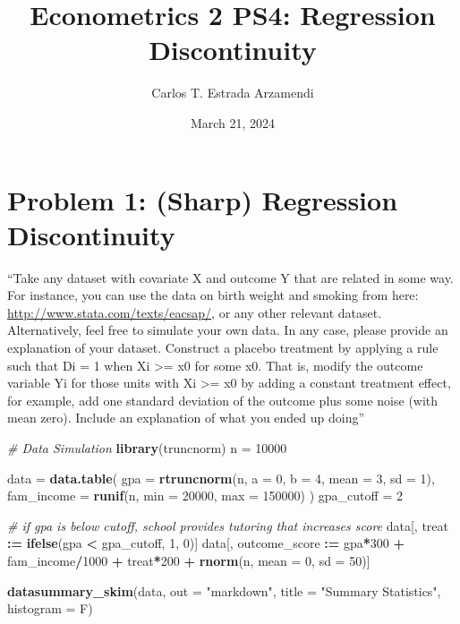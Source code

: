 \documentclass[
]{article}
\title{Econometrics 2 PS4: Regression Discontinuity}
\author{Carlos T. Estrada Arzamendi}
\date{March 21, 2024}
\newenvironment{Shaded}{\begin{snugshade}}{\end{snugshade}}
\newcommand{\AttributeTok}[1]{\textcolor[rgb]{0.13,0.29,0.53}{#1}}
\newcommand{\CommentTok}[1]{\textcolor[rgb]{0.56,0.35,0.01}{\textit{#1}}}
\newcommand{\DecValTok}[1]{\textcolor[rgb]{0.00,0.00,0.81}{#1}}
\newcommand{\FunctionTok}[1]{\textcolor[rgb]{0.13,0.29,0.53}{\textbf{#1}}}
\newcommand{\NormalTok}[1]{#1}
\newcommand{\OtherTok}[1]{\textcolor[rgb]{0.56,0.35,0.01}{#1}}
\newcommand{\SpecialCharTok}[1]{\textcolor[rgb]{0.81,0.36,0.00}{\textbf{#1}}}
\newcommand{\StringTok}[1]{\textcolor[rgb]{0.31,0.60,0.02}{#1}}
\begin{document}
\maketitle

\hypertarget{problem-1-sharp-regression-discontinuity}{%
\section{Problem 1: (Sharp) Regression
Discontinuity}\label{problem-1-sharp-regression-discontinuity}}



``Take any dataset with covariate X and outcome Y that are related in
some way. For instance, you can use the data on birth weight and smoking
from here: \url{http://www.stata.com/texts/eacsap/}, or any other
relevant dataset. Alternatively, feel free to simulate your own data. In
any case, please provide an explanation of your dataset. Construct a
placebo treatment by applying a rule such that Di = 1 when Xi
\textgreater= x0 for some x0. That is, modify the outcome variable Yi
for those units with Xi \textgreater= x0 by adding a constant treatment
effect, for example, add one standard deviation of the outcome plus some
noise (with mean zero). Include an explanation of what you ended up
doing''

\begin{Shaded}
\begin{Highlighting}[]
\CommentTok{\# Data Simulation}
\FunctionTok{library}\NormalTok{(truncnorm)}
\NormalTok{n }\OtherTok{=} \DecValTok{10000}

\NormalTok{data }\OtherTok{=} \FunctionTok{data.table}\NormalTok{(}
  \AttributeTok{gpa =} \FunctionTok{rtruncnorm}\NormalTok{(n, }\AttributeTok{a =} \DecValTok{0}\NormalTok{, }\AttributeTok{b =} \DecValTok{4}\NormalTok{, }\AttributeTok{mean =} \DecValTok{3}\NormalTok{, }\AttributeTok{sd =} \DecValTok{1}\NormalTok{),}
  \AttributeTok{fam\_income =} \FunctionTok{runif}\NormalTok{(n, }\AttributeTok{min =} \DecValTok{20000}\NormalTok{, }\AttributeTok{max =} \DecValTok{150000}\NormalTok{)}
\NormalTok{)}
\NormalTok{gpa\_cutoff }\OtherTok{=} \DecValTok{2}

\CommentTok{\# if gpa is below cutoff, school provides tutoring that increases score}
\NormalTok{data[, treat }\SpecialCharTok{:=} \FunctionTok{ifelse}\NormalTok{(gpa }\SpecialCharTok{\textless{}}\NormalTok{ gpa\_cutoff, }\DecValTok{1}\NormalTok{, }\DecValTok{0}\NormalTok{)]}
\NormalTok{data[, outcome\_score }\SpecialCharTok{:=}\NormalTok{ gpa}\SpecialCharTok{*}\DecValTok{300} \SpecialCharTok{+}\NormalTok{ fam\_income}\SpecialCharTok{/}\DecValTok{1000} \SpecialCharTok{+}\NormalTok{ treat}\SpecialCharTok{*}\DecValTok{200} \SpecialCharTok{+} \FunctionTok{rnorm}\NormalTok{(n, }\AttributeTok{mean =} \DecValTok{0}\NormalTok{, }\AttributeTok{sd =} \DecValTok{50}\NormalTok{)]}

\FunctionTok{datasummary\_skim}\NormalTok{(data, }\AttributeTok{out =} \StringTok{"markdown"}\NormalTok{, }\AttributeTok{title =} \StringTok{"Summary Statistics"}\NormalTok{, }\AttributeTok{histogram =}\NormalTok{ F)}
\end{Highlighting}
\end{Shaded}
\end{document}
